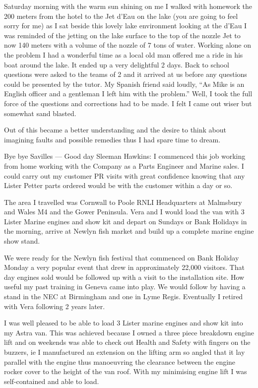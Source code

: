 Saturday morning with the warm sun shining on me I walked with homework the 200
meters from the hotel to the Jet d'Eau on the lake (you are going to feel sorry
for me) as I sat beside this lovely lake environment looking at the d'Eau I was
reminded of the jetting on the lake surface to the top of the nozzle Jet to now
140 meters with a volume of the nozzle of 7 tons of water. Working alone on
the problem I had a wonderful time as a local old man offered me a ride in his
boat around the lake. It ended up a very delightful 2 days. Back to school
questions were asked to the teams of 2 and it arrived at us before any
questions could be presented by the tutor. My Spanish friend said loudly, ``As
Mike is an English officer and a gentleman I left him with the problem.'' Well,
I took the full force of the questions and corrections had to be made. I felt
I came out wiser but somewhat sand blasted.

Out of this became a better understanding and the desire to think about
imagining faults and possible remedies thus I had spare time to dream.

Bye bye Savilles --- Good day Sleeman Hawkins: I commenced this job working
from home working with the Company as a Parts Engineer and Marine sales. I
could carry out my customer PR visits with great confidence knowing that any
Lister Petter parts ordered would be with the customer within a day or so.

The area I travelled was Cornwall to Poole RNLI Headquarters at Malmsbury and
Wales M4 and the Gower Peninsula. Vera and I would load the van with 3 Lister
Marine engines and show kit and depart on Sundays or Bank Holidays in the
morning, arrive at Newlyn fish market and build up a complete marine engine
show stand.

We were ready for the Newlyn fish festival that commenced on Bank Holiday Monday
a very popular event that drew in approximately 22,000 visitors. That day
engines sold would be followed up with a visit to the installation site. How
useful my past training in Geneva came into play. We would follow by having a
stand in the NEC at Birmingham and one in Lyme Regis. Eventually I retired
with Vera following 2 years later.

I was well pleased to be able to load 3 Lister marine engines and show kit into
my Astra van. This was achieved because I owned a three piece breakdown engine
lift and on weekends was able to check out Health and Safety with fingers on
the buzzers, ie I manufactured an extension on the lifting arm so angled that
it lay parallel with the engine thus manoeuvring the clearance between the
engine rocker cover to the height of the van roof. With my minimising engine
lift I was self-contained and able to load.

